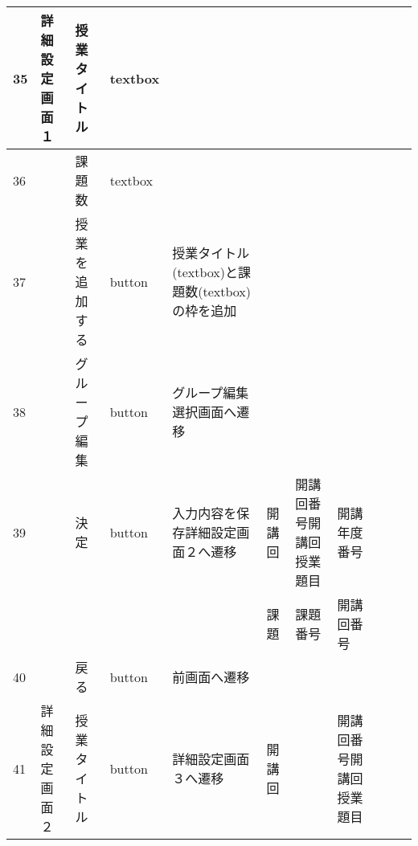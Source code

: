 \begin{table}[]
\begin{tabular}{|l|l|l|l|l|l|l|l|l|l|l|}
35  & 詳細設定画面１       & 授業タイトル           & textbox  &                                                                   &         &                       &                    &                 &                               &                                                                \\ \hline
36  &               & 課題数              & textbox  &                                                                   &         &                       &                    &                 &                               &                                                                \\ \hline
37  &               & 授業を追加する          & button   & 授業タイトル(textbox)と課題数(textbox)の枠を追加                                 &         &                       &                    &                 &                               &                                                                \\ \hline
38  &               & グループ編集           & button   & グループ編集選択画面へ遷移                                                     &         &                       &                    &                 &                               &                                                                \\ \hline
39  &               & 決定               & button   & 入力内容を保存詳細設定画面２へ遷移                                                 & 開講回     & 開講回番号開講回授業題目          & 開講年度番号             &                 &                               &                                                                \\ \hline
    &               &                  &          &                                                                   & 課題      & 課題番号                  & 開講回番号              &                 &                               &                                                                \\ \hline
40  &               & 戻る               & button   & 前画面へ遷移                                                            &         &                       &                    &                 &                               &                                                                \\ \hline
41  & 詳細設定画面２       & 授業タイトル           & button   & 詳細設定画面３へ遷移                                                        & 開講回     &                       & 開講回番号開講回授業題目       &                 &                               &                                                                \\ \hline

\end{tabular}
\end{table}
